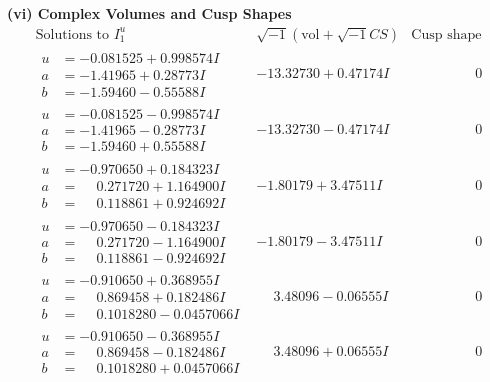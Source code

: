 \documentclass[1p]{elsarticle_modified}
\theoremstyle{definition}
\newcommand{\I}{\sqrt{-1}}
\begin{document}
\newpage\flushleft \textbf{(vi) Complex Volumes and Cusp Shapes}
$$\begin{array}{c|c|c}  
\text{Solutions to }I^u_{1}& \I (\text{vol} + \sqrt{-1}CS) & \text{Cusp shape}\\
 \hline 
\begin{aligned}
u &= -0.081525 + 0.998574 I \\
a &= -1.41965 + 0.28773 I \\
b &= -1.59460 - 0.55588 I\end{aligned}
 & -13.32730 + 0.47174 I & \phantom{-0.000000 } 0 \\ \hline\begin{aligned}
u &= -0.081525 - 0.998574 I \\
a &= -1.41965 - 0.28773 I \\
b &= -1.59460 + 0.55588 I\end{aligned}
 & -13.32730 - 0.47174 I & \phantom{-0.000000 } 0 \\ \hline\begin{aligned}
u &= -0.970650 + 0.184323 I \\
a &= \phantom{-}0.271720 + 1.164900 I \\
b &= \phantom{-}0.118861 + 0.924692 I\end{aligned}
 & -1.80179 + 3.47511 I & \phantom{-0.000000 } 0 \\ \hline\begin{aligned}
u &= -0.970650 - 0.184323 I \\
a &= \phantom{-}0.271720 - 1.164900 I \\
b &= \phantom{-}0.118861 - 0.924692 I\end{aligned}
 & -1.80179 - 3.47511 I & \phantom{-0.000000 } 0 \\ \hline\begin{aligned}
u &= -0.910650 + 0.368955 I \\
a &= \phantom{-}0.869458 + 0.182486 I \\
b &= \phantom{-}0.1018280 - 0.0457066 I\end{aligned}
 & \phantom{-}3.48096 - 0.06555 I & \phantom{-0.000000 } 0 \\ \hline\begin{aligned}
u &= -0.910650 - 0.368955 I \\
a &= \phantom{-}0.869458 - 0.182486 I \\
b &= \phantom{-}0.1018280 + 0.0457066 I\end{aligned}
 & \phantom{-}3.48096 + 0.06555 I & \phantom{-0.000000 } 0 \\ \hline\begin{aligned}

\end{aligned}
\end{array}$$
\end{document}
